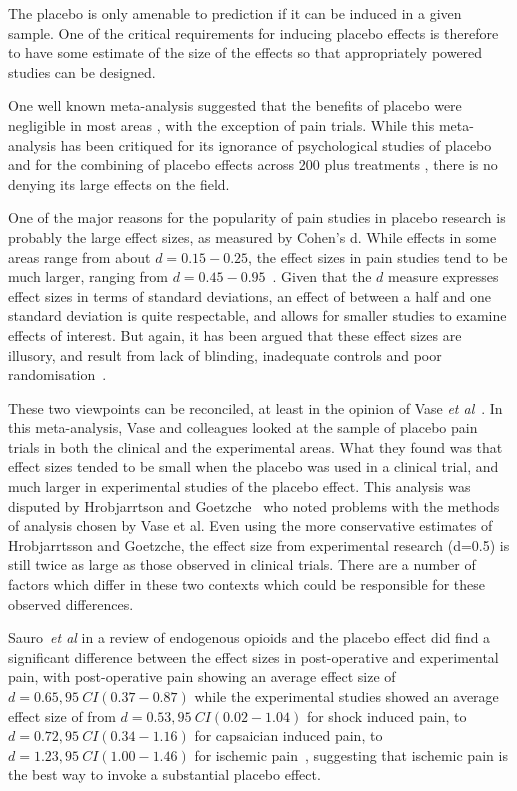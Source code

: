 The placebo is only amenable to prediction if it can be induced in a given sample. One of the critical requirements for inducing placebo effects is therefore to have some estimate of the size of the effects so that appropriately powered studies can be designed. 

One well known meta-analysis suggested that the benefits of placebo were negligible in most areas \cite{hrobjartsson2001}, with the exception of pain trials. While this meta-analysis has been critiqued for its ignorance of psychological studies of placebo \cite{Evans2003,Stewart-Williams2004b}  and for the combining of placebo effects across 200 plus treatments \cite{Wickramasekera2001}, there is no denying its large effects on the field. 

One of the major reasons for the popularity of pain studies in placebo research is probably the large effect sizes, as measured by Cohen's d. While effects in some areas range from about $d=0.15-0.25$, the effect sizes in pain studies tend to be much larger, ranging from $d=0.45-0.95$~\cite{Vase2002}. Given that the $d$ measure  expresses effect sizes in terms of standard deviations, an effect of between a half and one standard deviation is quite respectable, and allows for smaller studies to examine effects of interest.  But again, it has been argued that these effect sizes are illusory, and result from lack of blinding, inadequate controls and poor randomisation~\cite{hrobjartsson2003,Kienle1997}. 



These two viewpoints can be reconciled, at least in the opinion of Vase \textit{et al}~\cite{Vase2002}. In this meta-analysis, Vase and colleagues looked at the sample of placebo pain trials in both the clinical  and  the experimental areas. What they found was that effect sizes tended to be small when the placebo was used in a clinical trial, and much larger in experimental studies of the placebo effect. This analysis was disputed by Hrobjarrtson and Goetzche~\cite{hrobjartsson2003} who noted problems with the methods of analysis chosen by Vase et al. Even using the more conservative estimates of Hrobjarrtsson and Goetzche, the effect size from experimental research (d=0.5) is still twice as large as those observed in clinical trials. There are a number of factors which differ in these two contexts which could be responsible for these observed differences.  

Sauro~\textit{et al} in a review of endogenous opioids and the placebo effect did find a significant difference between the effect sizes in post-operative and experimental pain, with post-operative pain showing an average effect size of $d=0.65, 95~CI(0.37-0.87)$ while the experimental studies showed an average effect size of from $d=0.53, 95~CI(0.02-1.04)$ for shock induced pain, to $d=0.72, 95~CI(0.34-1.16)$ for capsaician induced pain, to $d=1.23, 95~CI(1.00-1.46)$ for ischemic pain~\cite{Sauro2005}, suggesting that ischemic pain is the best way to invoke a substantial placebo effect.


